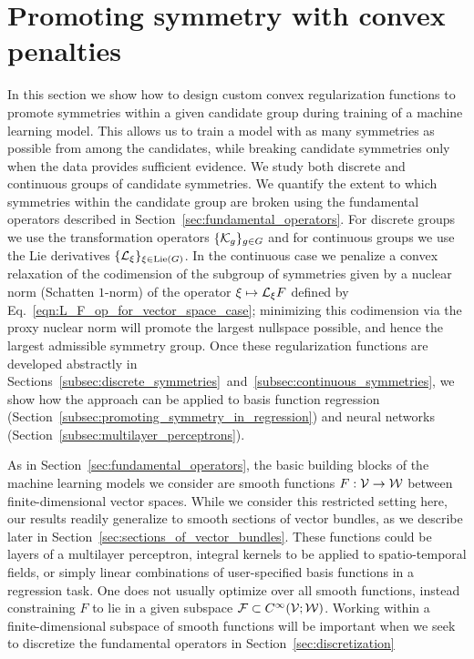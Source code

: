 \documentclass[twoside,11pt]{article}
\begin{document}
\section{Promoting symmetry with convex penalties}
\label{sec:promoting_symmetry}
In this section we show how to design custom convex regularization functions to promote symmetries within a given candidate group during training of a machine learning model.
This allows us to train a model with as many symmetries as possible from among the candidates, while breaking candidate symmetries only when the data provides sufficient evidence.
We study both discrete and continuous groups of candidate symmetries.
We quantify the extent to which symmetries within the candidate group are broken using the fundamental operators described in Section~\ref{sec:fundamental_operators}.
For discrete groups we use the transformation operators $\{{\mathcal{K}}_g\}_{g\in G}$ and for continuous groups we use the Lie derivatives $\{{\mathcal{L}}_{\xi}\}_{\xi\in\operatorname{Lie}(G)}$.
In the continuous case we penalize a convex relaxation of the codimension of the subgroup of symmetries given by a nuclear norm (Schatten $1$-norm) of the operator $\xi \mapsto {\mathcal{L}}_{\xi} F$ defined by Eq.~\ref{eqn:L_F_op_for_vector_space_case}; minimizing this codimension via the proxy nuclear norm will promote the largest nullspace possible, and hence the largest admissible symmetry group.
Once these regularization functions are developed abstractly in Sections~\ref{subsec:discrete_symmetries}~and~\ref{subsec:continuous_symmetries}, we show how the approach can be applied to basis function regression (Section~\ref{subsec:promoting_symmetry_in_regression}) and neural networks (Section~\ref{subsec:multilayer_perceptrons}).

As in Section~\ref{sec:fundamental_operators}, the basic building blocks of the machine learning models we consider are smooth functions $F: {\mathcal{V}} \to {\mathcal{W}}$ between finite-dimensional vector spaces.
While we consider this restricted setting here, our results readily generalize to smooth sections of vector bundles, as we describe later in Section~\ref{sec:sections_of_vector_bundles}.
These functions could be layers of a multilayer perceptron, integral kernels to be applied to spatio-temporal fields, or simply linear combinations of user-specified basis functions in a regression task.
One does not usually optimize over all smooth functions, instead constraining $F$ to lie in a given subspace ${\mathcal{F}} \subset C^{\infty}({\mathcal{V}};{\mathcal{W}})$.
Working within a finite-dimensional subspace of smooth functions will be important when we seek to discretize the fundamental operators in Section~\ref{sec:discretization}
\end{document}
